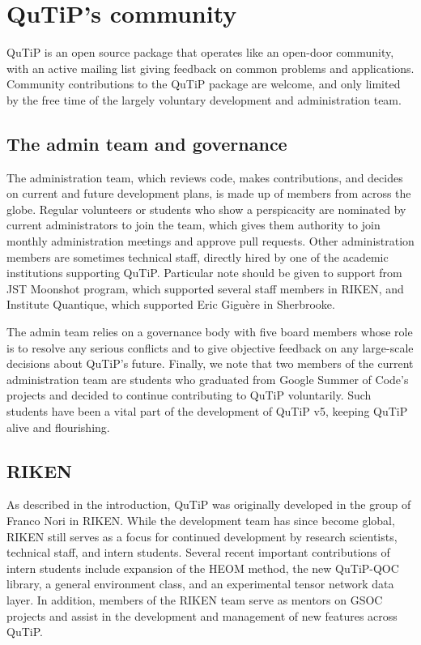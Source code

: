 \documentclass[preprint,3p,sort&compress]{elsarticle}
\begin{document}
\section{QuTiP's community}

QuTiP is an open source package that operates like an open-door community, with an active mailing list giving feedback on common problems and applications.  Community contributions to the QuTiP package are welcome, and only limited by the free time of the largely voluntary development and administration team.


\subsection{The admin team and governance}

The administration team, which reviews code, makes contributions, and decides on current and future development plans, is made up of members from across the globe. Regular volunteers or students who show a perspicacity are nominated by current administrators to join the team, which gives them authority to join monthly administration meetings and approve pull requests.  Other administration members are sometimes technical staff, directly hired by one of the academic institutions supporting QuTiP. Particular note should be given to support from JST Moonshot program, which supported several staff members in RIKEN, and Institute Quantique, which supported Eric Giguère in Sherbrooke. 


The admin team relies on a governance body with five board members whose role is to resolve any serious conflicts and to give objective feedback on any large-scale decisions about QuTiP's future. Finally, we note that two members of the current administration team are students who graduated from Google Summer of Code's projects and decided to continue contributing to QuTiP voluntarily.  Such students have been a vital part of the development of QuTiP v5, keeping QuTiP alive and flourishing.%


\subsection{RIKEN}

As described in the introduction, QuTiP was originally developed in the group of Franco Nori in RIKEN.  While the development team has since become global, RIKEN still serves as a focus for continued development by research scientists, technical staff, and intern students. Several recent important contributions of intern students include expansion of the HEOM method, the new QuTiP-QOC library, a general environment class, and an experimental tensor network data layer.  In addition, members of the RIKEN team serve as mentors on GSOC projects and assist in the development and management of new features across QuTiP.  
\end{document}
